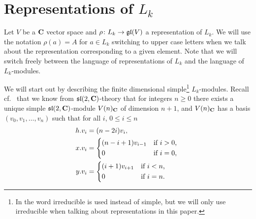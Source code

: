 \section{Representations of \texorpdfstring{$L_k$}{L\_k}}

Let $V$ be a $\mathbf{C}$ vector space and $\rho\colon L_k \to \mathfrak{gl}(V)$ a representation of $L_k$. We will use the notation $\rho(a)=A$ for $a\in L_k$ switching to upper case letters when we talk about the representation corresponding to a given element. Note that we will switch freely between the language of representations of $L_k$ and the language of $L_k$-modules.

We will start out by describing the finite dimensional simple\footnote{In \cite{indecompReprOfLorGr} the word irreducible is used instead of simple, but we will only use irreducible when talking about representations in this paper.} $L_k$-modules. Recall cf.\ \cite[36]{jantzen} that we know from $\mathfrak{sl}(2,\mathbf{C})$-theory that for integers $n\geq 0$ there exists a unique simple $\mathfrak{sl}(2,\mathbf{C})$-module $V(n)_{\mathbf{C}}$ of dimension $n+1$, and $V(n)_{\mathbf{C}}$ has a basis $(v_0,v_1,\dotsc,v_n)$ such that for all $i$, $0\leq i\leq n$
\begin{align*}
  h.v_i &= (n-2i)v_i, \\
  x.v_i &=
          \begin{dcases*}
            (n-i+1)v_{i-1} & if $i>0$, \\
            0 & if $i=0$,
          \end{dcases*} \\
  y.v_i &=
          \begin{dcases*}
            (i+1)v_{i+1} & if $i<n$, \\
            0 & if $i=n$.
          \end{dcases*}
\end{align*}

